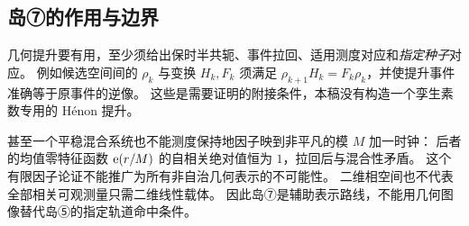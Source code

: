 \subsection{岛⑦的作用与边界}
几何提升要有用，至少须给出保时半共轭、事件拉回、适用测度对应和\emph{指定种子}对应。
例如候选空间间的 $\rho_k$ 与变换 $H_k,F_k$ 须满足
$\rho_{k+1}H_k=F_k\rho_k$，并使提升事件准确等于原事件的逆像。
这些是需要证明的附接条件，本稿没有构造一个孪生素数专用的 Hénon 提升。

甚至一个平稳混合系统也不能测度保持地因子映到非平凡的模 $M$ 加一时钟：
后者的均值零特征函数 $\mathrm e(r/M)$ 的自相关绝对值恒为 $1$，拉回后与混合性矛盾。
这个有限因子论证不能推广为所有非自治几何表示的不可能性。
二维相空间也不代表全部相关可观测量只需二维线性载体。
因此岛⑦是辅助表示路线，不能用几何图像替代岛⑤的指定轨道命中条件。
